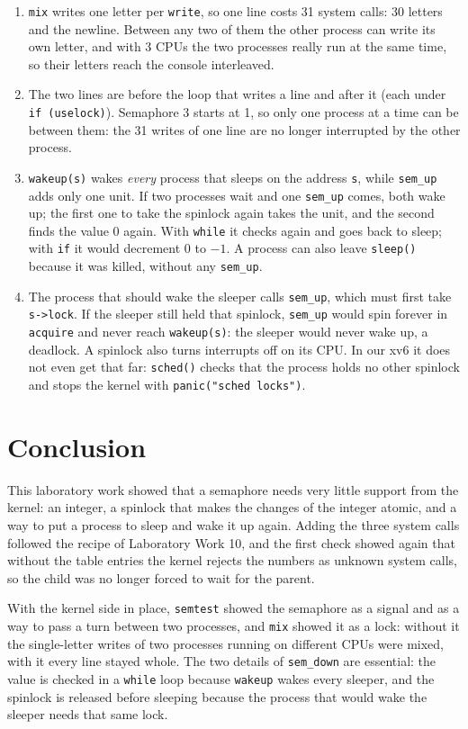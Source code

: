 \documentclass[12pt,a4paper]{article}
\newcommand{\inlinecmd}[1]{\texttt{\detokenize{#1}}}
\begin{document}
\begin{enumerate}
  \item \texttt{mix} writes one letter per \texttt{write}, so one line costs 31 system calls: 30 letters and the newline. Between any two of them the other process can write its own letter, and with 3 CPUs the two processes really run at the same time, so their letters reach the console interleaved.
  \item The two lines are \inlinecmd{sem_down(3);} before the loop that writes a line and \inlinecmd{sem_up(3);} after it (each under \texttt{if (uselock)}). Semaphore 3 starts at 1, so only one process at a time can be between them: the 31 writes of one line are no longer interrupted by the other process.
  \item \texttt{wakeup(s)} wakes \emph{every} process that sleeps on the address \texttt{s}, while \texttt{sem\_up} adds only one unit. If two processes wait and one \texttt{sem\_up} comes, both wake up; the first one to take the spinlock again takes the unit, and the second finds the value 0 again. With \texttt{while} it checks again and goes back to sleep; with \texttt{if} it would decrement 0 to $-1$. A process can also leave \texttt{sleep()} because it was killed, without any \texttt{sem\_up}.
  \item The process that should wake the sleeper calls \texttt{sem\_up}, which must first take \texttt{s->lock}. If the sleeper still held that spinlock, \texttt{sem\_up} would spin forever in \texttt{acquire} and never reach \texttt{wakeup(s)}: the sleeper would never wake up, a deadlock. A spinlock also turns interrupts off on its CPU. In our xv6 it does not even get that far: \texttt{sched()} checks that the process holds no other spinlock and stops the kernel with \texttt{panic("sched locks")}.
\end{enumerate}

\newpage
\section*{Conclusion}

This laboratory work showed that a semaphore needs very little support from the kernel: an integer, a spinlock that makes the changes of the integer atomic, and a way to put a process to sleep and wake it up again. Adding the three system calls followed the recipe of Laboratory Work 10, and the first check showed again that without the table entries the kernel rejects the numbers as unknown system calls, so the child was no longer forced to wait for the parent.

With the kernel side in place, \texttt{semtest} showed the semaphore as a signal and as a way to pass a turn between two processes, and \texttt{mix} showed it as a lock: without it the single-letter writes of two processes running on different CPUs were mixed, with it every line stayed whole. The two details of \texttt{sem\_down} are essential: the value is checked in a \texttt{while} loop because \texttt{wakeup} wakes every sleeper, and the spinlock is released before sleeping because the process that would wake the sleeper needs that same lock.
\end{document}
